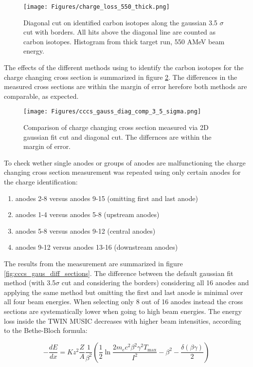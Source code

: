 \begin{figure}[htpb]
    \centering
    \texttt{[image: Figures/charge\_loss\_550\_thick.png]}
    \caption{
    Diagonal cut on identified carbon isotopes along the gaussian 3.5 $\sigma$ cut with borders. All hits above the diagonal line are counted as carbon isotopes. Histogram from thick target run, 550 AMeV beam energy.
     }
    \label{fig:diagonal_cut_twim}
\end{figure}
The effects of the different methods using to identify the carbon isotopes for the charge changing cross section is summarized in figure \ref{fig:cccs_gaus_vs_diag}. The differences in the measured cross sections are within the margin of error herefore both methods are comparable, as expected.
\begin{figure}[htpb]
    \centering
    \texttt{[image: Figures/cccs\_gauss\_diag\_comp\_3\_5\_sigma.png]}
    \caption{
    Comparison of charge changing cross section measured via 2D gaussian fit cut and diagonal cut. The differnces are within the margin of error.
     }
    \label{fig:cccs_gaus_vs_diag}
\end{figure}
To check wether single anodes or groups of anodes are malfunctioning the charge changing cross section measurement was repeated using only certain anodes for the charge identification:
\begin{enumerate}[label=\alph*)]
\itemsep0em
\item anodes 2-8 versus anodes 9-15 (omitting first and last anode)
\item anodes 1-4 versus anodes 5-8 (upstream anodes)
\item anodes 5-8 versus anodes 9-12 (central anodes)
\item anodes 9-12 versus anodes 13-16 (downstream anodes)
\end{enumerate}
The results from the measurement are summarized in figure \ref{fig:cccs_gaus_diff_sections}. The difference between the default gaussian fit method (with 3.5$\sigma$ cut and considering the borders) considering all 16 anodes and applying the same method but omitting the first and last anode is minimal over all four beam energies. When selecting only 8 out of 16 anodes instead the cross sections are systematically lower when going to high beam energies. The energy loss inside the TWIN MUSIC decreases with higher beam intensities, according to the Bethe-Bloch formula:

\begin{equation}
-\frac{dE}{dx} = K z^2 \frac{Z}{A} \frac{1}{\beta^2} \left( \frac{1}{2} \ln \frac{2 m_e c^2 \beta^2 \gamma^2 T_{\text{max}}}{I^2} - \beta^2 - \frac{\delta(\beta \gamma)}{2} \right)
\end{equation}

